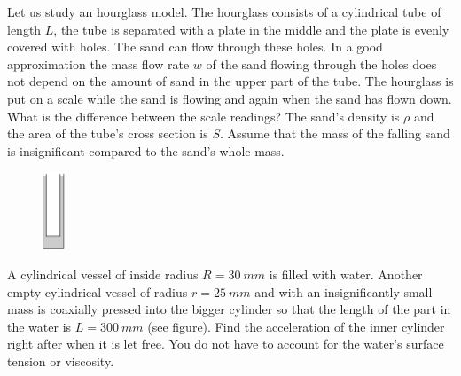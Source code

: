 \documentclass[11pt]{article}
\begin{document}

\probeng
Let us study an hourglass model. The hourglass consists of a cylindrical tube of length $L$, the tube is separated with a plate in the middle and the plate is evenly covered with holes. The sand can flow through these holes. In a good approximation the mass flow rate $w$ of the sand flowing through the holes does not depend on the amount of sand in the upper part of the tube. The hourglass is put on a scale while the sand is flowing and again when the sand has flown down. What is the difference between the scale readings? The sand’s density is $\rho$ and the area of the tube’s cross section is $S$. Assume that the mass of the falling sand is insignificant compared to the sand’s whole mass.
\probend
\bigskip


\probeng
\begin{figure}%
\vspace{-15pt}
\includegraphics[width=0.06\textwidth]{2014-v3g-08-cylinders}
\end{figure}
A cylindrical vessel of inside radius $R = \SI{30}{mm}$ is filled with water. Another empty cylindrical vessel of radius $r =\SI{25}{mm}$ and with an insignificantly small mass is coaxially pressed into the bigger cylinder so that the length of the part in the water is $L = \SI{300}{mm}$ (see figure). Find the acceleration of the inner cylinder right after when it is let free. You do not have to account for the water’s surface tension or viscosity.
\probend
\bigskip

\end{document}
